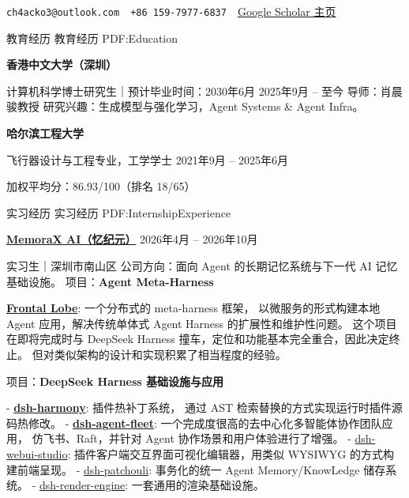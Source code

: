 \documentclass[letterpaper,MMMyyyy,nonstopmode]{simpleresumecv}
\newcommand{\UseCVBodyFont}{\normalfont\fontsize{9.5pt}{12.5pt}\selectfont}
\renewcommand{\Gap}{\par\vspace{0.75mm}\par}
\renewcommand{\BigGap}{\par\vspace{2.8mm}\par}
\renewcommand{\DatestampYMD}[3]{\mbox{#1年#2月}}
\renewcommand{\DatestampYM}[2]{\mbox{#1年#2月}}
\newcommand{\CVAuthor}{郑祯睿}
\newcommand{\CVWebpage}{https://scholar.google.com/citations?user=KPpd1pYAAAAJ}
\begin{document}
\Title{\CVAuthor}

\begin{SubTitle}
 \texttt{ch4acko3@outlook.com}
\,\SubBulletSymbol\,
 \texttt{+86\,159-7977-6837}
\,\SubBulletSymbol\,
\href{\CVWebpage}
{ Google Scholar 主页}
\end{SubTitle}

\begin{Body}
\UseCVBodyFont


\Section
{教育经历}
{教育经历}
{PDF:Education}

\Entry
\textbf{香港中文大学（深圳）}

\Gap
\BulletItem
计算机科学博士研究生｜预计毕业时间：2030年6月
\hfill
\DatestampYMD{2025}{9}{1} --
至今
\BulletItem
导师：肖晨骏教授
\BulletItem
研究兴趣：生成模型与强化学习，Agent Systems \& Agent Infra。

\BigGap

\Entry
\textbf{哈尔滨工程大学}

\Gap
\BulletItem
飞行器设计与工程专业，工学学士
\hfill
\DatestampYMD{2021}{9}{15} --
\DatestampYMD{2025}{6}{15}
\begin{Detail}
\SubBulletItem
加权平均分：86.93/100（排名 18/65）
\end{Detail}


\Section
{实习经历}
{实习经历}
{PDF:InternshipExperience}

\Entry
\href{https://memorax.net/}{\textbf{MemoraX AI（忆纪元）}}
\hfill
\DatestampYM{2026}{4} --
\DatestampYM{2026}{10}

\Gap
\BulletItem
实习生｜深圳市南山区
\BulletItem
公司方向：面向 Agent 的长期记忆系统与下一代 AI 记忆基础设施。
\BulletItem
项目：\textbf{Agent Meta-Harness}
\hfill
\begin{Detail}
\Item
\href{https://github.com/CH4AcKO3/Frontal-Lobe}{\textbf{Frontal Lobe}}: 一个分布式的 meta-harness 框架，
以微服务的形式构建本地 Agent 应用，解决传统单体式 Agent Harness 的扩展性和维护性问题。
这个项目在即将完成时与 DeepSeek Harness 撞车，定位和功能基本完全重合，因此决定终止。
但对类似架构的设计和实现积累了相当程度的经验。

\end{Detail}
\BulletItem
项目：\textbf{DeepSeek Harness 基础设施与应用}
\hfill
\begin{Detail}
\Item
- \href{https://github.com/memorax-ai/dsh-harmony}{\textbf{dsh-harmony}}: 插件热补丁系统，
通过 AST 检索替换的方式实现运行时插件源码热修改。
\Item
- \href{https://github.com/CH4AcKO3/dsh-agent-fleet}{\textbf{dsh-agent-fleet}}: 一个完成度很高的去中心化多智能体协作团队应用，
仿飞书、Raft，并针对 Agent 协作场景和用户体验进行了增强。
\Item
- \href{https://github.com/memorax-ai/dsh-webui-studio}{dsh-webui-studio}: 插件客户端交互界面可视化编辑器，用类似 WYSIWYG 的方式构建前端呈现。
\Item
- \href{https://github.com/memorax-ai/dsh-patchouli}{dsh-patchouli}: 事务化的统一 Agent Memory/KnowLedge 储存系统。
\Item
- \href{https://github.com/CH4AcKO3/dsh-render-engine}{dsh-render-engine}: 一套通用的渲染基础设施。
\
\end{Detail}


\end{Body}
\end{document}
